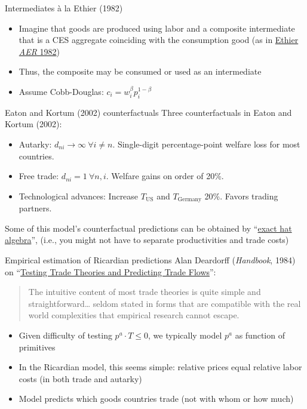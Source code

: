 \documentclass[11pt,notes=hide,aspectratio=169]{beamer}
\begin{document}
\begin{frame}{Intermediates \`{a} la Ethier (1982)}
\begin{itemize}
	\item Imagine that goods are produced using labor and a composite intermediate that is a CES aggregate coinciding with the consumption good (as in \href{https://www.jstor.org/stable/1831539}{Ethier \textit{AER} 1982})
	\item Thus, the composite may be consumed or used as an intermediate
	\item Assume Cobb-Douglas: $c_i = w_i^\beta p_i^{1-\beta}$
\end{itemize}
\end{frame}
\begin{frame}{Eaton and Kortum (2002) counterfactuals}
Three counterfactuals in Eaton and Kortum (2002):
\begin{itemize}
	\item Autarky: $d_{ni} \to \infty \ \forall i\neq n$. Single-digit percentage-point welfare loss for most countries.
	\item Free trade: $d_{ni}=1 \ \forall n,i$. Welfare gains on order of 20\%.
	\item Technological advances: Increase $T_{\text{US}}$ and  $T_{\text{Germany}}$ 20\%. Favors trading partners.
\end{itemize}
Some of this model's counterfactual predictions can be obtained by ``\href{https://tradediversion.net/2018/05/07/on-hat-algebra/}{exact hat algebra}'', (i.e., you might not have to separate productivities and trade costs)
\end{frame}
\begin{frame}{Empirical estimation of Ricardian predictions}
Alan Deardorff (\textit{Handbook}, 1984) on ``\href{https://doi.org/10.1016/S1573-4404(84)01013-3}{Testing Trade Theories and Predicting Trade Flows}'':
\begin{quote}
The intuitive content of most trade theories is quite simple and straightforward\dots 
seldom stated in forms that are compatible with the real world complexities that empirical research cannot escape.
\end{quote}
\begin{itemize}
	\item Given difficulty of testing $p^a \cdot T \leq 0$,
	we typically model $p^a$ as function of primitives
	\item In the Ricardian model, this seems simple: 
	relative prices equal relative labor costs (in both trade and autarky)
	\item Model predicts which goods countries trade (not with whom or how much)
\end{itemize}
\end{frame}
\end{document}
